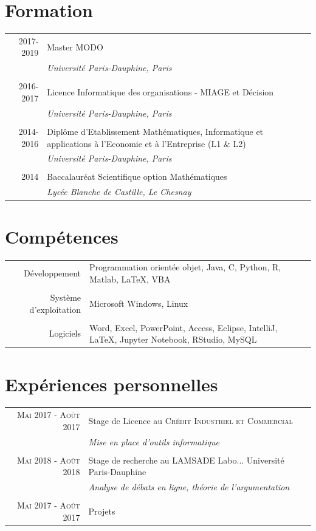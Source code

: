 \documentclass[a4paper,10pt]{article}
\begin{document}
\section{Formation}
\begin{tabular}{r|p{11cm}}
 \textsc{2017-2019} & Master MODO \\&\emph{\small{Université Paris-Dauphine, Paris}}\\\multicolumn{2}{c}{} \\
 \textsc{2016-2017} & Licence Informatique des organisations - MIAGE et Décision \\&\emph{\small{Université Paris-Dauphine, Paris}}\\\multicolumn{2}{c}{} \\
 \textsc{2014-2016} & Diplôme d'Etablissement Mathématiques, Informatique et applications à l'Economie et à l'Entreprise (L1 \& L2) \\&\emph{\small{Université Paris-Dauphine, Paris}}\\\multicolumn{2}{c}{} \\
 \textsc{2014} & Baccalauréat Scientifique option Mathématiques \\&\emph{\small{Lycée Blanche de Castille, Le Chesnay}}\\
\end{tabular}

\section{Compétences}
\begin{tabular}{rl}	
 Développement & Programmation orientée objet, Java, C, Python, R, Matlab, \LaTeX, VBA\\&\\
Système d'exploitation & Microsoft Windows, Linux\\&\\
Logiciels & Word, Excel, PowerPoint, Access, Eclipse, IntelliJ, LaTeX, Jupyter Notebook, RStudio, MySQL
\end{tabular}

\section{Expériences personnelles}
\begin{tabular}{rl}	
 \textsc{Mai} 2017 - \textsc{Août} 2017 & Stage de Licence au \textsc{Crédit Industriel et Commercial}\\&
 \emph{\small{Mise en place d'outils informatique}}\\&\\
 \textsc{Mai} 2018 - \textsc{Août} 2018 & Stage de recherche au \textsc{LAMSADE} Labo... Université Paris-Dauphine\\&
 \emph{\small{Analyse de débats en ligne, théorie de l'argumentation}}\\&\\
 \textsc{Mai} 2017 - \textsc{Août} 2017 & Projets
\end{tabular}
\end{document}
